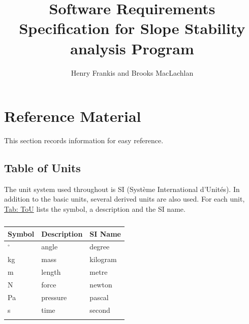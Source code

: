 \documentclass[12pt]{article}
\title{Software Requirements Specification for Slope Stability analysis Program}
\author{Henry Frankis and Brooks MacLachlan}
\begin{document}
\maketitle
\tableofcontents
\newpage
\section{Reference Material}
\label{Sec:RefMat}
This section records information for easy reference.
\subsection{Table of Units}
\label{Sec:ToU}
The unit system used throughout is SI (Système International d'Unités). In addition to the basic units, several derived units are also used. For each unit, \hyperref[Table:ToU]{Tab: ToU} lists the symbol, a description and the SI name.
\begin{longtable}{l l l}
\toprule
\textbf{Symbol} & \textbf{Description} & \textbf{SI Name}
\\
\midrule
\endhead
${}^{\circ}$ & angle & degree
\\
kg & mass & kilogram
\\
m & length & metre
\\
N & force & newton
\\
Pa & pressure & pascal
\\
s & time & second
\\
\bottomrule
\caption{}
\label{Table:ToU}
\end{longtable}
\end{document}
